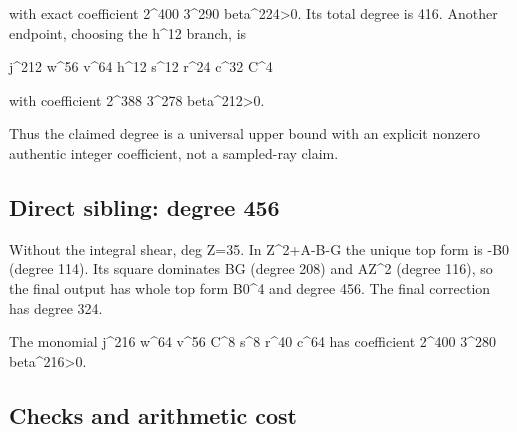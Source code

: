 with exact coefficient 2\textasciicircum{}\allowbreak{}400 3\textasciicircum{}\allowbreak{}290 beta\textasciicircum{}\allowbreak{}224\textgreater{}\allowbreak{}0. Its total degree is 416. Another endpoint, choosing the h\textasciicircum{}\allowbreak{}12 branch, is



j\textasciicircum{}\allowbreak{}212 w\textasciicircum{}\allowbreak{}56 v\textasciicircum{}\allowbreak{}64 h\textasciicircum{}\allowbreak{}12 s\textasciicircum{}\allowbreak{}12 r\textasciicircum{}\allowbreak{}24 c\textasciicircum{}\allowbreak{}32 C\textasciicircum{}\allowbreak{}4



with coefficient 2\textasciicircum{}\allowbreak{}388 3\textasciicircum{}\allowbreak{}278 beta\textasciicircum{}\allowbreak{}212\textgreater{}\allowbreak{}0.



Thus the claimed degree is a universal upper bound with an explicit nonzero authentic integer coefficient, not a sampled-ray claim.



\subsection*{Direct sibling: degree 456}



Without the integral shear, deg Z=\allowbreak{}35. In Z\textasciicircum{}\allowbreak{}2+\allowbreak{}A-B-G the unique top form is -B0 (degree 114). Its square dominates BG (degree 208) and AZ\textasciicircum{}\allowbreak{}2 (degree 116), so the final output has whole top form B0\textasciicircum{}\allowbreak{}4 and degree 456. The final correction has degree 324.



The monomial j\textasciicircum{}\allowbreak{}216 w\textasciicircum{}\allowbreak{}64 v\textasciicircum{}\allowbreak{}56 C\textasciicircum{}\allowbreak{}8 s\textasciicircum{}\allowbreak{}8 r\textasciicircum{}\allowbreak{}40 c\textasciicircum{}\allowbreak{}64 has coefficient 2\textasciicircum{}\allowbreak{}400 3\textasciicircum{}\allowbreak{}280 beta\textasciicircum{}\allowbreak{}216\textgreater{}\allowbreak{}0.



\subsection*{Checks and arithmetic cost}



